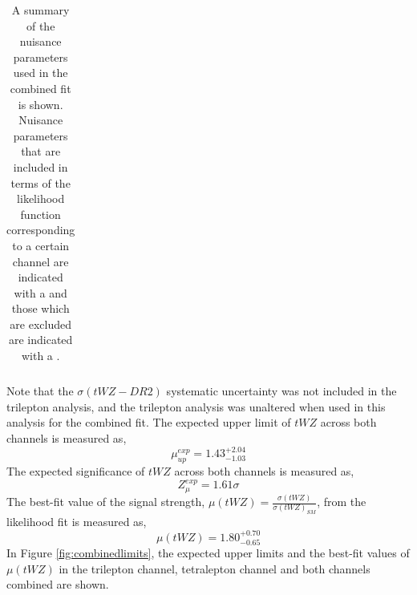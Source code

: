 \begin{table}[h!]
{\begin{tabular}{c|c|c}
\hline
\end{tabular}}
\centering
\caption{A summary of the nuisance parameters used in the combined fit is shown. Nuisance parameters that are included in terms of the likelihood function corresponding to a certain channel are indicated with a \cmark and those which are excluded are indicated with a \xmark.}
\label{tab:NP-combined}
\end{table}
Note that the $\sigma (tWZ-DR2)$ systematic uncertainty was not included in the trilepton analysis, and the trilepton analysis was unaltered when used in this analysis for the combined fit. The expected upper limit of $tWZ$ across both channels is measured as,
\begin{equation}
  \mu_{up}^{exp} = 1.43^{+2.04}_{-1.03}
\end{equation}
The expected significance of $tWZ$ across both channels is measured as,
\begin{equation}
 Z_{\mu}^{exp} = 1.61\sigma
\end{equation}
The best-fit value of the signal strength, $\mu (tWZ)= \frac{\sigma(tWZ)}{\sigma(tWZ)_{SM}}$, from the likelihood fit is measured as,
\begin{equation}
\mu (tWZ) =   1.80^{+0.70}_{-0.65}
\end{equation}
In Figure \ref{fig:combinedlimits}, the expected upper limits and the best-fit values of $\mu (tWZ)$ in the trilepton channel, tetralepton channel and both channels combined are shown.
